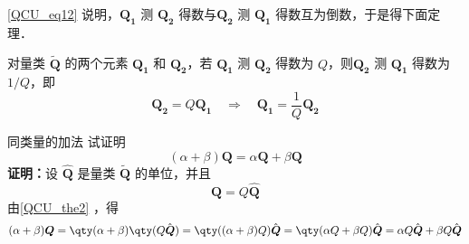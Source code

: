 \autoref{QCU_eq12} 说明，$\boldsymbol{Q_1}$ 测 $\boldsymbol{Q_2}$ 得数与$\boldsymbol{Q_2}$ 测 $\boldsymbol{Q_1}$ 得数互为倒数，于是得下面定理．
\begin{theorem}{}
对量类 $\widetilde{\boldsymbol{Q}}$ 的两个元素 $\boldsymbol{Q_1}$ 和 $\boldsymbol{Q_2}$，若 $\boldsymbol{Q_1}$ 测 $\boldsymbol{Q_2}$ 得数为 $Q$，则$\boldsymbol{Q_2}$ 测 $\boldsymbol{Q_1}$ 得数为 $1/Q$，即
\begin{equation}
\boldsymbol{Q_2}=Q\boldsymbol{Q_1}\quad\Rightarrow\quad\boldsymbol{Q_1}=\frac{1}{Q}\boldsymbol{Q_2}
\end{equation}
\end{theorem}
\begin{example}{同类量的加法}
试证明
\begin{equation}
(\alpha +\beta)\boldsymbol{Q}=\alpha\boldsymbol{Q} +\beta\boldsymbol{Q}
\end{equation}
\textbf{证明：}设 $\hat{\boldsymbol{Q}}$ 是量类 $\tilde{\boldsymbol{Q}}$ 的单位，并且
\begin{equation}
\boldsymbol{Q}=Q\hat{\boldsymbol{Q}}
\end{equation}
由\autoref{QCU_the2} ，得
\begin{equation}
(\alpha+\beta)\boldsymbol{Q}=\qty(\alpha+\beta)\qty(Q\hat{\boldsymbol{Q}})=\qty((\alpha+\beta)Q)\hat{\boldsymbol{Q}}=\qty(\alpha Q+\beta Q)\hat{\boldsymbol{Q}}=\alpha Q\hat{\boldsymbol{Q}}+\beta Q\hat{\boldsymbol{Q}}
\end{equation}

\end{example}